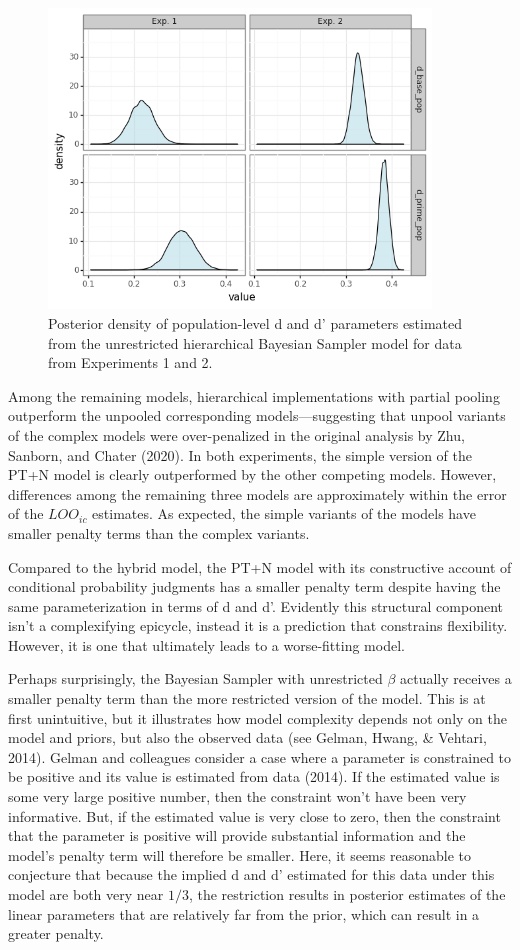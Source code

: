 \documentclass[
  english,
  man,floatsintext]{apa6}
\begin{document}
\begin{figure}[ht]
\centering
\includegraphics[width=4in]{plot_params.png}
\caption{Posterior density of population-level d and d' parameters estimated from the unrestricted hierarchical Bayesian Sampler model for data from Experiments 1 and 2.}
\end{figure}

Among the remaining models, hierarchical implementations with partial pooling outperform the unpooled corresponding models---suggesting that unpool variants of the complex models were over-penalized in the original analysis by Zhu, Sanborn, and Chater (2020). In both experiments, the simple version of the PT+N model is clearly outperformed by the other competing models. However, differences among the remaining three models are approximately within the error of the \(LOO_{ic}\) estimates. As expected, the simple variants of the models have smaller penalty terms than the complex variants.

Compared to the hybrid model, the PT+N model with its constructive account of conditional probability judgments has a smaller penalty term despite having the same parameterization in terms of d and d'. Evidently this structural component isn't a complexifying epicycle, instead it is a prediction that constrains flexibility. However, it is one that ultimately leads to a worse-fitting model.

Perhaps surprisingly, the Bayesian Sampler with unrestricted \(\beta\) actually receives a smaller penalty term than the more restricted version of the model. This is at first unintuitive, but it illustrates how model complexity depends not only on the model and priors, but also the observed data (see Gelman, Hwang, \& Vehtari, 2014). Gelman and colleagues consider a case where a parameter is constrained to be positive and its value is estimated from data (2014). If the estimated value is some very large positive number, then the constraint won't have been very informative. But, if the estimated value is very close to zero, then the constraint that the parameter is positive will provide substantial information and the model's penalty term will therefore be smaller. Here, it seems reasonable to conjecture that because the implied d and d' estimated for this data under this model are both very near \(1/3\), the restriction results in posterior estimates of the linear parameters that are relatively far from the prior, which can result in a greater penalty.
\end{document}
